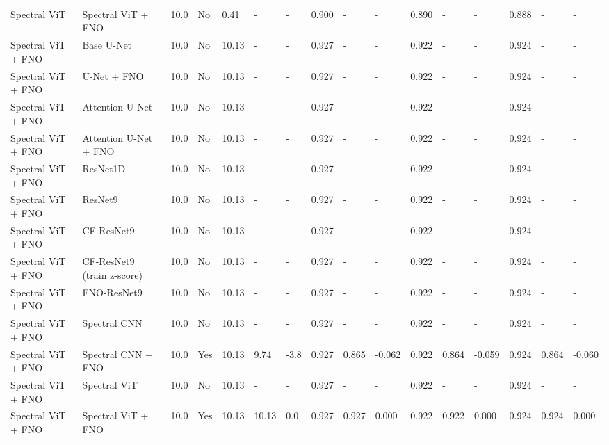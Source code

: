 \begin{longtable}{llllllllllllllll}
Spectral ViT & Spectral ViT + FNO & 10.0 & No & 0.41 & - & - & 0.900 & - & - & 0.890 & - & - & 0.888 & - & - \\
Spectral ViT + FNO & Base U-Net & 10.0 & No & 10.13 & - & - & 0.927 & - & - & 0.922 & - & - & 0.924 & - & - \\
Spectral ViT + FNO & U-Net + FNO & 10.0 & No & 10.13 & - & - & 0.927 & - & - & 0.922 & - & - & 0.924 & - & - \\
Spectral ViT + FNO & Attention U-Net & 10.0 & No & 10.13 & - & - & 0.927 & - & - & 0.922 & - & - & 0.924 & - & - \\
Spectral ViT + FNO & Attention U-Net + FNO & 10.0 & No & 10.13 & - & - & 0.927 & - & - & 0.922 & - & - & 0.924 & - & - \\
Spectral ViT + FNO & ResNet1D & 10.0 & No & 10.13 & - & - & 0.927 & - & - & 0.922 & - & - & 0.924 & - & - \\
Spectral ViT + FNO & ResNet9 & 10.0 & No & 10.13 & - & - & 0.927 & - & - & 0.922 & - & - & 0.924 & - & - \\
Spectral ViT + FNO & CF-ResNet9 & 10.0 & No & 10.13 & - & - & 0.927 & - & - & 0.922 & - & - & 0.924 & - & - \\
Spectral ViT + FNO & CF-ResNet9 (train z-score) & 10.0 & No & 10.13 & - & - & 0.927 & - & - & 0.922 & - & - & 0.924 & - & - \\
Spectral ViT + FNO & FNO-ResNet9 & 10.0 & No & 10.13 & - & - & 0.927 & - & - & 0.922 & - & - & 0.924 & - & - \\
Spectral ViT + FNO & Spectral CNN & 10.0 & No & 10.13 & - & - & 0.927 & - & - & 0.922 & - & - & 0.924 & - & - \\
Spectral ViT + FNO & Spectral CNN + FNO & 10.0 & Yes & 10.13 & 9.74 & -3.8 & 0.927 & 0.865 & -0.062 & 0.922 & 0.864 & -0.059 & 0.924 & 0.864 & -0.060 \\
Spectral ViT + FNO & Spectral ViT & 10.0 & No & 10.13 & - & - & 0.927 & - & - & 0.922 & - & - & 0.924 & - & - \\
Spectral ViT + FNO & Spectral ViT + FNO & 10.0 & Yes & 10.13 & 10.13 & 0.0 & 0.927 & 0.927 & 0.000 & 0.922 & 0.922 & 0.000 & 0.924 & 0.924 & 0.000 \\
\end{longtable}
